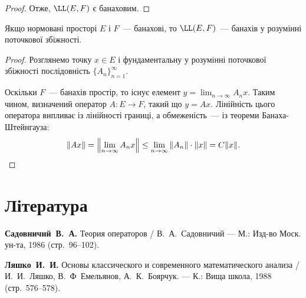 \begin{proof}
Отже, $\LL(E, F)$ є банаховим. 
\end{proof}

\begin{theorem}
Якщо нормовані просторі $E$ і $F$~--- банахові,
то $\LL(E, F)$~--- банахів у розумінні поточкової збіжності.
\end{theorem}

\begin{proof}
Розглянемо точку $x \in E$ і фундаментальну у
розумінні поточкової збіжності послідовність $\{A_n\}_{n = 1}^\infty$.

Оскільки $F$~--- банахів простір, то існує елемент $y = \lim_{n \to \infty} A_n x$.
Таким чином, визначений оператор
$A: E \to F$, такий що $y = Ax$. Лінійність цього оператора
випливає із лінійності границі, а обмеженість~--- із теореми
Банаха-Штейнгауза:
\begin{equation*}
    \|A x\| =
    \left\| \lim_{n \to \infty} A_n x\right\| \le
    \lim_{n \to \infty} \|A_n\| \cdot \|x\| =
    C \|x\|. \qedhere
\end{equation*}
\end{proof}

\section{Література}

\begin{enumerate}[label={[\arabic*]}]
\item \textbf{Садовничий~В.~А.}
Теория операторов /
В.~А.~Садовничий ---
М.: Изд-во Моск. ун-та, 1986 (стр.~96--102).
\item \textbf{Ляшко~И.~И.}
Основы классического и современного математического анализа /
И.~И.~Ляшко, В.~Ф~Емельянов, А.~К.~Боярчук. ---
К.: Вища школа, 1988 (стр.~576--578).
\end{enumerate}
